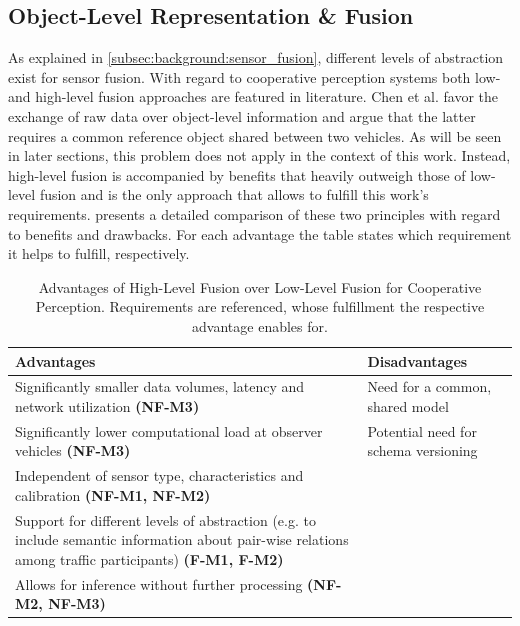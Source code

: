 \subsection{Object-Level Representation \& Fusion}
\label{subsec:concept_design:object_level_representation_fusion}
As explained in \cref{subsec:background:sensor_fusion}, different levels of abstraction exist for sensor fusion. With regard to cooperative perception systems both low- and high-level fusion approaches are featured in literature. Chen et al. \cite{Chen2019} favor the exchange of raw data over object-level information and argue that the latter requires a common reference object shared between two vehicles. As will be seen in later sections, this problem does not apply in the context of this work. Instead, high-level fusion is accompanied by benefits that heavily outweigh those of low-level fusion and is the only approach that allows to fulfill this work's requirements.  presents a detailed comparison of these two principles with regard to benefits and drawbacks. For each advantage the table states which requirement it helps to fulfill, respectively. 

\begin{table}[H]
	\centering
	\begin{tabular}{|p{7.5cm}|p{7.5cm}|}
		\hline
		\textbf{Advantages} & \textbf{Disadvantages} \\ \hline
		Significantly smaller data volumes, latency and network utilization \textbf{(NF-M3)} & Need for a common, shared model \\ \hline
		Significantly lower computational load at observer vehicles \textbf{(NF-M3)} & Potential need for schema versioning \\ \hline
		Independent of sensor type, characteristics and calibration \textbf{(NF-M1, NF-M2)} & \multirow{3}{*}{} \\ \cline{1-1}
		Support for different levels of abstraction (e.g. to include semantic information about pair-wise relations among traffic participants) \textbf{(F-M1, F-M2)} &  \\ \cline{1-1}
		Allows for inference without further processing \textbf{(NF-M2, NF-M3)} &  \\ \hline
	\end{tabular}
	\caption[Comparison High-/Low Level Fusion]{Advantages of High-Level Fusion over Low-Level Fusion for Cooperative Perception. Requirements are referenced, whose fulfillment the respective advantage enables for.}
	\label{tab:comparison_fusion}
\end{table}

